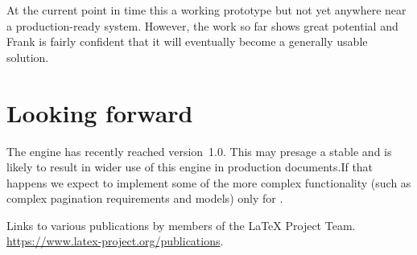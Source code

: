 \documentclass{ltnews}
\begin{document}
At the current point in time this a working prototype but not yet anywhere near
a production-ready system. However, the work so far shows great potential and
Frank is fairly confident that it will eventually become a generally usable
solution.

\section{Looking forward}

The  engine has recently reached version~1.0. This may presage a
stable  and is likely to result in wider use of this engine in
production documents.If that happens we expect to implement some of the more
complex functionality (such as complex pagination requirements and models) only
for .

\begin{thebibliography}{10}
  \raggedright
    Links to various publications by members of the \LaTeX{} Project Team.
    \newblock \url{https://www.latex-project.org/publications}.
\end{thebibliography}
\end{document}
